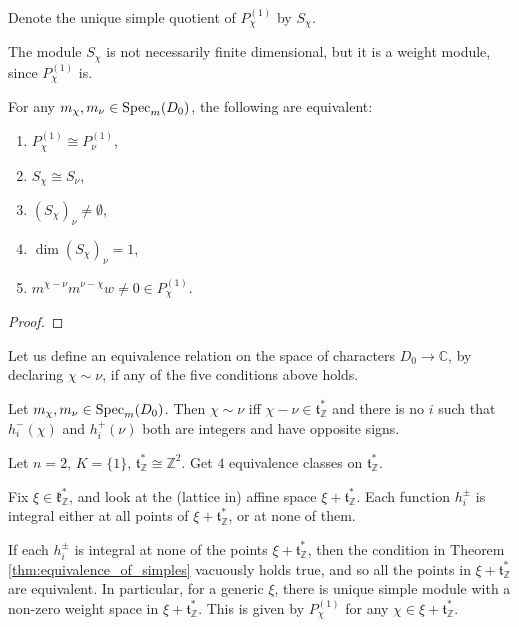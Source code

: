 Denote the unique simple quotient of $P_\chi^{(1)}$ by $S_\chi$.

\begin{remark}
The module $S_\chi$ is not necessarily finite dimensional, but it is a weight module, since $P_\chi^{(1)}$ is.
\end{remark}

\begin{proposition}
For any $m_\chi,m_\nu\in{\rm Spec }_m(D_0)$, the following are equivalent:
\begin{enumerate}
    \item $P_\chi^{(1)}\cong P_\nu^{(1)}$,
    \item $S_\chi\cong S_\nu$,
    \item $\left(S_\chi\right)_\nu \neq \emptyset$,
    \item $\dim \left(S_\chi\right)_\nu =1 $,
    \item $m^{\chi-\nu}m^{\nu-\chi}w\neq 0\in P_\chi^{(1)}$.
\end{enumerate}
\end{proposition}

\begin{proof}

\end{proof}

Let us define an equivalence relation on the space of characters $D_0\to \mathbb{C}$, by declaring $\chi \sim \nu$, if any of the five conditions above holds.

\begin{theorem}\label{thm:equivalence_of_simples}
Let $m_\chi,m_\nu\in{\rm Spec }_m(D_0)$. Then $\chi \sim \nu$ iff $\chi-\nu\in\mathfrak{t}^*_\mathbb{Z}$ and there is no $i$ such that $h_i^-(\chi)$ and $h_i^+(\nu)$ both are integers and have opposite signs.
\end{theorem}

\begin{example}
Let $n=2$, $K=\{1\}$, $\mathfrak{t}^*_\mathbb{Z}\cong \mathbb{Z}^2$. Get $4$ equivalence classes on $\mathfrak{t}^*_\mathbb{Z}$. 
\end{example}

Fix $\xi \in \mathfrak{k}^*_\mathbb{Z}$, and look at the (lattice in) affine space $\xi+\mathfrak{t}^*_\mathbb{Z}$. Each function $h_i^\pm$ is integral either at all points of $\xi+\mathfrak{t}^*_\mathbb{Z}$, or at none of them. 

If each $h_i^\pm$ is integral at none of the points $\xi+\mathfrak{t}^*_\mathbb{Z}$, then the condition in Theorem \ref{thm:equivalence_of_simples} vacuously holds true, and so all the points in $\xi+\mathfrak{t}^*_\mathbb{Z}$ are equivalent. In particular, for a generic $\xi$, there is unique simple module with a non-zero weight space in $\xi+\mathfrak{t}^*_\mathbb{Z}$. This is given by $P_\chi^{(1)}$ for any $\chi \in \xi+\mathfrak{t}^*_\mathbb{Z}$.


